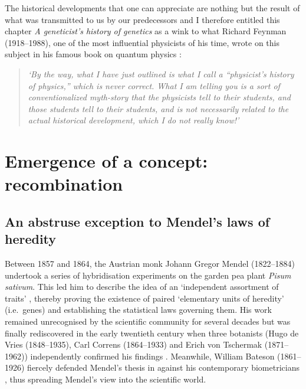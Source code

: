 The historical developments that one can appreciate are nothing but the result of what was transmitted to us by our predecessors and I therefore entitled this chapter \textit{A geneticist's history of genetics} as a wink to what Richard Feynman (1918--1988), one of the most influential physicists of his time, wrote on this subject in his famous book on quantum physics \textit{} \citeyearpar{feynman2006qed}:

\begin{quote}
	\textit{‘By the way, what I have just outlined is what I call a “physicist’s history of physics,” which is never correct. What I am telling you is a sort of conventionalized myth-story that the physicists tell to their students, and those students tell to their students, and is not necessarily related to the actual historical development, which I do not really know!’}
\end{quote}






\section{Emergence of a concept: recombination}

\subsection{An abstruse exception to Mendel's laws of heredity}

Between 1857 and 1864, the Austrian monk Johann Gregor Mendel (1822--1884) undertook a series of hybridisation experiments on the garden pea plant \textit{Pisum sativum}. This led him to describe the idea of an ‘independent assortment of traits’ \citep{mendel1996experiments}, thereby proving the existence of paired ‘elementary units of heredity’ (i.e.\ genes) and establishing the statistical laws governing them.
His work remained unrecognised by the scientific community for several decades but was finally rediscovered in the early twentieth century when three botanists (Hugo de Vries (1848--1935), Carl Correns (1864--1933) and Erich von Tschermak (1871--1962)) independently confirmed his findings \citep{dunn2003gregor}.
Meanwhile, William Bateson (1861--1926) fiercely defended Mendel's thesis in \textit{} \citep{bateson1902mendel} against his contemporary biometricians \citep[reviewed in][]{bateson2002william}, thus spreading Mendel's view into the scientific world.\\

